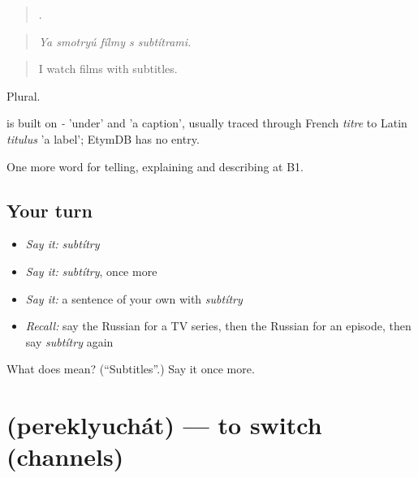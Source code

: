 \begin{quote}
    .
\end{quote}

\begin{quote}
\emph{Ya smotryú fílmy s subtítrami.}
\end{quote}

\begin{quote}
I watch films with subtitles.
\end{quote}

Plural.

\begin{cousinweb}
\emph{} is built on \emph{-} 'under' and \emph{} 'a caption', usually traced through French \emph{titre} to Latin \emph{titulus} 'a label'; EtymDB has no entry.
\end{cousinweb}

\begin{grammarlens}[title={What you've built}]
One more word for telling, explaining and describing at B1.
\end{grammarlens}

\subsection*{Your turn}
\begin{itemize}
\raggedright
  \item \emph{Say it:} \emph{subtítry}
  \item \emph{Say it:} \emph{subtítry}, once more
  \item \emph{Say it:} a sentence of your own with \emph{subtítry}
  \item \emph{Recall:} say the Russian for a TV series, then the Russian for an episode, then say \emph{subtítry} again
\end{itemize}

\begin{tcolorbox}[breakable,colback=teal!4,colframe=teal!35!black,title={Before you move on}]
What does  mean? (\textquotedblleft{}Subtitles\textquotedblright{}.) Say it once more.
\end{tcolorbox}
\section[\texorpdfstring{\ru{переключать} (pereklyuchát)}{переключать (pereklyuchát)}]{ (pereklyuchát) — to switch (channels)}

